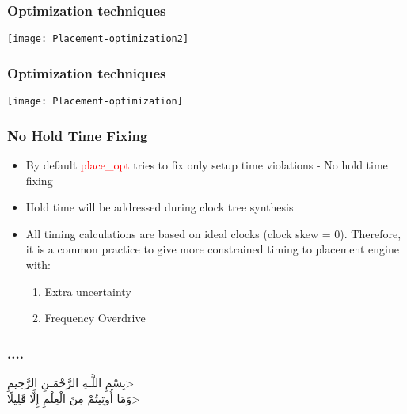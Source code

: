 \documentclass[compress]{beamer}
\begin{document}
\begin{frame}
	\frametitle{Optimization techniques}
	\begin{center}
		\texttt{[image: Placement-optimization2]}
	\end{center}
\end{frame}
\begin{frame}
	\frametitle{Optimization techniques}
	\begin{center}
		\texttt{[image: Placement-optimization]}
	\end{center}
\end{frame}
\begin{frame}
	\frametitle{No Hold Time Fixing}
	\begin{itemize}
		\item By default \textcolor{red}{place\_opt} tries to fix only setup time
		violations - No hold time fixing
		\item Hold time will be addressed during clock tree
		synthesis
		\item All timing calculations are based on ideal clocks (clock skew = 0). Therefore,
		it is a common practice to give more constrained timing to placement
		engine with:
		\begin{enumerate}
			\item Extra uncertainty
			\item Frequency Overdrive
		\end{enumerate}
	\end{itemize}
\end{frame}
\begin{frame}
	\frametitle{....}
	\begin{center}
		\<بِسْمِ اللَّـهِ الرَّحْمَـٰنِ الرَّحِيمِ> \\
		\<وَمَا أُوتِيتُمْ مِنَ الْعِلْمِ إِلَّا قَلِيلًا>
		
	\end{center}
\end{frame}
\end{document}
